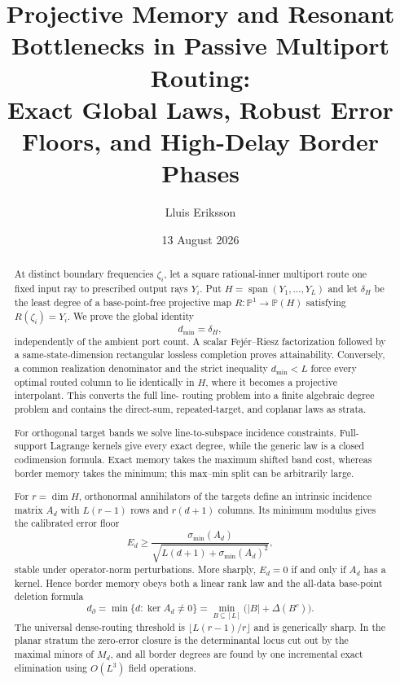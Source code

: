 \documentclass[11pt]{article}
\title{Projective Memory and Resonant Bottlenecks in Passive Multiport Routing:\\
Exact Global Laws, Robust Error Floors, and High-Delay Border Phases}
\author{Lluis Eriksson}
\date{13 August 2026}
\theoremstyle{definition}\newtheorem{definition}[theorem]{Definition}\newtheorem{example}[theorem]{Example}
\theoremstyle{remark}\newtheorem{remark}[theorem]{Remark}\newtheorem{limitation}[theorem]{Limitation}
\newcommand{\PP}{\mathbb P}\newcommand{\rank}{\operatorname{rank}}
\begin{document}
\maketitle

\begin{abstract}
At distinct boundary frequencies $\zeta_i$, let a square rational-inner
multiport route one fixed input ray to prescribed output rays $Y_i$.  Put
$H=\operatorname{span}(Y_1,\ldots,Y_L)$ and let $\delta_H$ be the least degree
of a base-point-free projective map
$R:\PP^1\to\PP(H)$ satisfying $R(\zeta_i)=Y_i$.  We prove the global identity
\[
                         d_{\min}=\delta_H,
\]
independently of the ambient port count.  A scalar Fej\'er--Riesz factorization
followed by a same-state-dimension rectangular lossless completion proves
attainability.  Conversely, a common realization denominator and the strict
inequality $d_{\min}<L$ force every optimal routed column to lie identically in
$H$, where it becomes a projective interpolant.  This converts the full line-
routing problem into a finite algebraic degree problem and contains the
direct-sum, repeated-target, and coplanar laws as strata.

For orthogonal target bands we solve line-to-subspace incidence constraints.
Full-support Lagrange kernels give every exact degree, while the
generic law is a closed codimension formula.  Exact memory takes the maximum
shifted band cost, whereas border memory takes the minimum; this max--min split
can be arbitrarily large.

For $r=\dim H$, orthonormal annihilators of the targets define an intrinsic
incidence matrix $A_d$ with $L(r-1)$ rows and $r(d+1)$ columns.  Its
minimum modulus gives the calibrated error floor
\[
 E_d\ge \frac{\sigma_{\min}(A_d)}
 {\sqrt{L(d+1)+\sigma_{\min}(A_d)^2}},
\]
stable under operator-norm perturbations.  More sharply,
$E_d=0$ if and only if $A_d$ has a kernel.  Hence border memory obeys both
a linear rank law and the all-data base-point deletion formula
\[
 d_\partial=\min\{d:\ker A_d\ne0\}
 =\min_{B\subseteq[L]}\bigl(|B|+\Delta(B^c)\bigr).
\]
The universal dense-routing threshold is
$\lfloor L(r-1)/r\rfloor$ and is generically sharp.
In the planar stratum the zero-error closure is the determinantal locus cut
out by the maximal minors of $M_d$, and all border degrees are found by one
incremental exact elimination using $O(L^3)$ field operations.


\end{abstract}
\end{document}
